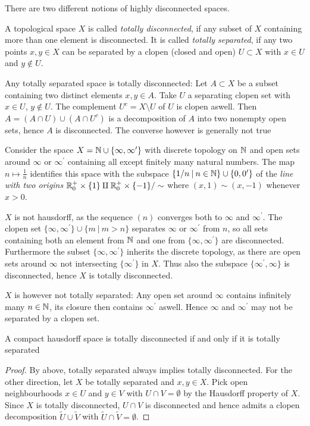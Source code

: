 \documentclass{notes}
\begin{document}
\textcolor{black}{}
{\milan 
There are two different notions of highly disconnected spaces.
\begin{definition}
    A topological space $X$ is called \emph{totally disconnected}, if any subset of $X$ containing more than one element is disconnected.
    It is called \emph{totally separated}, if any two points $x,y\in X$ can be separated by a clopen (closed and open) $U\subset X$ with $x\in U$ and $y\not\in U$.
\end{definition}
Any totally separated space is totally disconnected:
Let $A\subset X$ be a subset containing two distinct elements $x,y \in A$. Take $U$ a separating clopen set with $x\in U$, $y\not\in U$. 
The complement $U^c = X\setminus U$ of $U$ is clopen aswell.
Then $A = (A\cap U) \cup (A\cap U^c)$ is a decomposition of $A$ into two nonempty open sets, hence $A$ is disconnected.
The converse however is generally not true
\begin{example}
    Consider the space $X = {\mathbb{N}}\cup \{\infty, \infty^\prime\}$ with discrete topology on ${\mathbb{N}}$ and open sets around $\infty$ or $\infty^\prime$ containing all except finitely many natural numbers.
    The map $n\mapsto \frac{1}{n}$ identifies this space with the subspace $\{1/n \:\vert\: n\in{\mathbb{N}}\}\cup\{0,0^\prime\}$ of the \emph{line with two origins} ${\mathbb{R}}_0^+\times\{1\} \amalg {\mathbb{R}}_0^+\times\{-1\} / \sim$ where $(x,1)\sim (x,-1)$ whenever $x>0$.

    $X$ is not hausdorff, as the sequence $(n)$ converges both to $\infty$ and $\infty^\prime$.
    The clopen set $\{\infty,\infty^\prime \}\cup \{m \:\vert\: m> n\}$ separates $\infty$ or $\infty^\prime$ from $n$, so all sets containing both an element from ${\mathbb{N}}$ and one from $\{\infty,\infty^\prime\}$ are disconnected.
    Furthermore the subset $\{\infty,\infty^\prime\}$ inherits the discrete topology, as there are open sets around $\infty$ not intersecting $\{\infty^\prime\}$ in $X$.
    Thus also the subspace $\{\infty^\prime,\infty\}$ is disconnected, hence $X$ is totally disconnected.

    $X$ is however not totally separated: Any open set around $\infty$ contains infinitely many $n\in {\mathbb{N}}$, its closure then contains $\infty^\prime$ aswell. 
    Hence $\infty$ and $\infty^\prime$ may not be separated by a clopen set.
\end{example}
\begin{lemma}
    A compact hausdorff space is totally disconnected if and only if it is totally separated
\end{lemma}
\begin{proof}
By above, totally separated always implies totally disconnected. 
For the other direction, let $X$ be totally separated and $x,y\in X$. 
Pick open neighbourhoods $x\in U$ and $y\in V$ with $U\cap V = \emptyset$ by the Hausdorff property of $X$.
    Since $X$ is totally disconnected, $U\cap V$ is disconnected and hence admits a clopen decomposition $\widetilde{U}\cup \widetilde{V}$ with $\widetilde{U} \cap \widetilde{V} = \emptyset$.
\end{proof}
}
\end{document}
